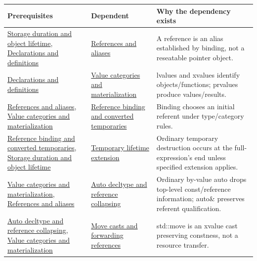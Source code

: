 {\def\LTcaptype{none} %
\begin{longtable}[]{@{}
  >{\raggedright\arraybackslash}p{}
  >{\raggedright\arraybackslash}p{}
  >{\raggedright\arraybackslash}p{}@{}}
\toprule\noalign{}
\begin{minipage}[b]{\linewidth}\raggedright
Prerequisites
\end{minipage} & \begin{minipage}[b]{\linewidth}\raggedright
Dependent
\end{minipage} & \begin{minipage}[b]{\linewidth}\raggedright
Why the dependency exists
\end{minipage} \\
\midrule\noalign{}
\endhead
\bottomrule\noalign{}
\endlastfoot
\hyperref[appendix-0b104bcba06b]{Storage duration and object lifetime}, \hyperref[appendix-2e4d494c2d94]{Declarations and definitions} & \hyperref[appendix-d6d562ca9fbb]{References and aliases} & A reference is an alias established by binding, not a reseatable pointer object. \\
\hyperref[appendix-2e4d494c2d94]{Declarations and definitions} & \hyperref[appendix-1121b30eaeb0]{Value categories and materialization} & lvalues and xvalues identify objects/functions; prvalues produce values/results. \\
\hyperref[appendix-d6d562ca9fbb]{References and aliases}, \hyperref[appendix-1121b30eaeb0]{Value categories and materialization} & \hyperref[appendix-37856d997bb0]{Reference binding and converted temporaries} & Binding chooses an initial referent under type/category rules. \\
\hyperref[appendix-37856d997bb0]{Reference binding and converted temporaries}, \hyperref[appendix-0b104bcba06b]{Storage duration and object lifetime} & \hyperref[appendix-a978b29bbbb0]{Temporary lifetime extension} & Ordinary temporary destruction occurs at the full-expression's end unless specified extension applies. \\
\hyperref[appendix-1121b30eaeb0]{Value categories and materialization}, \hyperref[appendix-d6d562ca9fbb]{References and aliases} & \hyperref[appendix-5d4252a42886]{Auto decltype and reference collapsing} & Ordinary by-value auto drops top-level const/reference information; auto\& preserves referent qualification. \\
\hyperref[appendix-5d4252a42886]{Auto decltype and reference collapsing}, \hyperref[appendix-1121b30eaeb0]{Value categories and materialization} & \hyperref[appendix-0104b704fb11]{Move casts and forwarding references} & std::move is an xvalue cast preserving constness, not a resource transfer. \\

\end{longtable}}
